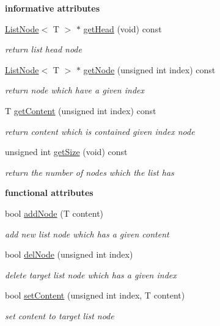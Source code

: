 \begin{Indent}{\bf informative attributes}\par
\begin{DoxyCompactItemize}
\item 
\hyperlink{class_list_node}{List\-Node}$<$ T $>$ $\ast$ \hyperlink{class_list_af2c3e1f19c7e67dde94da7ed06a79b87}{get\-Head} (void) const 
\begin{DoxyCompactList}\small\item\em return list head node \end{DoxyCompactList}\item 
\hyperlink{class_list_node}{List\-Node}$<$ T $>$ $\ast$ \hyperlink{class_list_a4fc3be0f87fa727acfb6b6b001433bc9}{get\-Node} (unsigned int index) const 
\begin{DoxyCompactList}\small\item\em return node which have a given index \end{DoxyCompactList}\item 
T \hyperlink{class_list_aa93404b4c7f3f86a560a0a675f55c9bd}{get\-Content} (unsigned int index) const 
\begin{DoxyCompactList}\small\item\em return content which is contained given index node \end{DoxyCompactList}\item 
unsigned int \hyperlink{class_list_a4d8d3acaf718d470e1084814a6155814}{get\-Size} (void) const 
\begin{DoxyCompactList}\small\item\em return the number of nodes which the list has \end{DoxyCompactList}\end{DoxyCompactItemize}
\end{Indent}
\begin{Indent}{\bf functional attributes}\par
\begin{DoxyCompactItemize}
\item 
bool \hyperlink{class_list_ac8fff7396766358cee488223009ac578}{add\-Node} (T content)
\begin{DoxyCompactList}\small\item\em add new list node which has a given content \end{DoxyCompactList}\item 
bool \hyperlink{class_list_af4e9e7db2b56cd948ec225445f3250da}{del\-Node} (unsigned int index)
\begin{DoxyCompactList}\small\item\em delete target list node which has a given index \end{DoxyCompactList}\item 
bool \hyperlink{class_list_adfc10aaf74f0ffc4a48b6ed46c192093}{set\-Content} (unsigned int index, T content)
\begin{DoxyCompactList}\small\item\em set content to target list node \end{DoxyCompactList}\end{DoxyCompactItemize}
\end{Indent}
